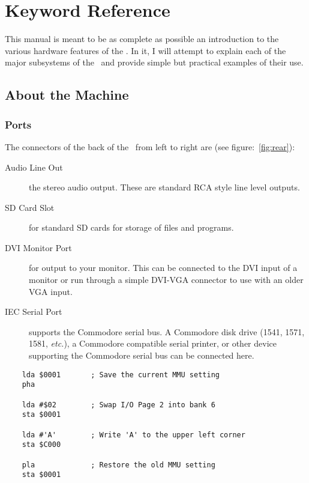 \chapter{Keyword Reference}

This manual is meant to be as complete as possible an introduction to the various hardware features of the \jr. In it, I will attempt to explain each of the major subsystems of the \jr\ and provide simple but practical examples of their use.

\section*{About the Machine}

\subsection*{Ports}

The connectors of the back of the \jr\ from left to right are (see figure:~\ref{fig:rear}):

\begin{description}
    \item[Audio Line Out] the stereo audio output. These are standard RCA style line level outputs.

    \item[SD Card Slot] for standard SD cards for storage of files and programs.

    \item[DVI Monitor Port] for output to your monitor. This can be connected to the DVI input of a monitor or run through a simple DVI-VGA connector to use with an older VGA input.

    \item[IEC Serial Port] supports the Commodore serial bus. A Commodore disk drive (1541, 1571, 1581, {\it etc.}), a Commodore compatible serial printer, or other device supporting the Commodore serial bus can be connected here.
\end{description}


\begin{verbatim}
    lda $0001       ; Save the current MMU setting
    pha

    lda #$02        ; Swap I/O Page 2 into bank 6
    sta $0001

    lda #'A'        ; Write 'A' to the upper left corner
    sta $C000

    pla             ; Restore the old MMU setting
    sta $0001
\end{verbatim}